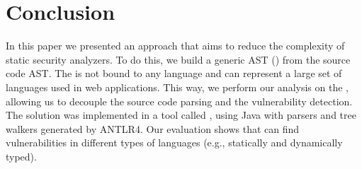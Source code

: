 \section{Conclusion}
In this paper we presented an approach that aims to reduce the complexity of static security analyzers. To do this, we build a generic AST (\astname{}) from the source code AST. The \astname{} is not bound to any language and can represent a large set of languages used in web applications. This way, we perform our analysis on the \astname{}, allowing us to decouple the source code parsing and the vulnerability detection. The solution was implemented in a tool called \toolname{}, using Java with parsers and tree walkers generated by ANTLR4. Our evaluation shows that \toolname{} can find vulnerabilities in different types of languages (e.g., statically and dynamically typed).